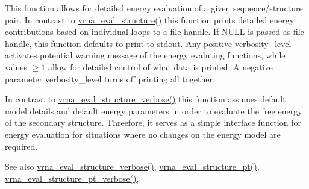This function allows for detailed energy evaluation of a given sequence/structure pair. In contrast to \hyperlink{group__eval_ga58f199f1438d794a265f3b27fc8ea631}{vrna\+\_\+eval\+\_\+structure()} this function prints detailed energy contributions based on individual loops to a file handle. If N\+U\+LL is passed as file handle, this function defaults to print to stdout. Any positive {\ttfamily verbosity\+\_\+level} activates potential warning message of the energy evaluting functions, while values $ \ge 1 $ allow for detailed control of what data is printed. A negative parameter {\ttfamily verbosity\+\_\+level} turns off printing all together.

In contrast to \hyperlink{group__eval_ga0928d699d310178f84ee2351034e5cb5}{vrna\+\_\+eval\+\_\+structure\+\_\+verbose()} this function assumes default model details and default energy parameters in order to evaluate the free energy of the secondary structure. Threefore, it serves as a simple interface function for energy evaluation for situations where no changes on the energy model are required.

\begin{DoxySeeAlso}{See also}
\hyperlink{group__eval_ga0928d699d310178f84ee2351034e5cb5}{vrna\+\_\+eval\+\_\+structure\+\_\+verbose()}, \hyperlink{group__eval_gadbd09372ddfd7a450bbd590c96a6bfe4}{vrna\+\_\+eval\+\_\+structure\+\_\+pt()}, \hyperlink{group__eval_ga8a517cfeeae8c376ae7b1e0c401d38b4}{vrna\+\_\+eval\+\_\+structure\+\_\+pt\+\_\+verbose()},
\end{DoxySeeAlso}


